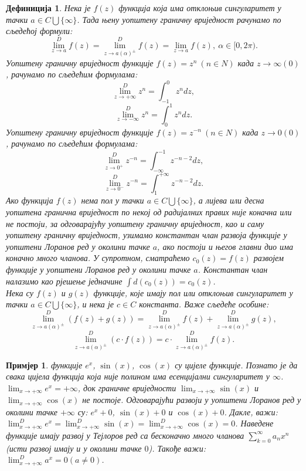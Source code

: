 \documentclass[12pt]{article}
\newtheorem{definition}{Дефиниција}
\newtheorem{example}{Примјер}
\begin{document}
\begin{definition}
Нека је $f(z)$ функција која има отклоњив сингуларитет у тачки $a\in C\bigcup\{\infty\}$. 
Тада њену уопштену граничну вриједност рачунамо по сљедећој формули: $$\lim^D_{z\to a} f(z)=\lim^D_{z\to a(\alpha)^\pm} f(z)=\lim_{z\to a} f(z),\ \alpha\in[0,2\pi).$$ Уопштену граничну вриједност функције $f(z)=z^n\ (n\in N)$ када $z\to\infty(0)$, рачунамо по сљедећим формулама: $$\lim^D_{z\to+\infty} z^n=\int_{-1}^0 z^n dz,$$ $$\lim^D_{z\to-\infty} z^n=\int_0^1 z^n dz.$$ Уопштену граничну вриједност функције $f(z)=z^{-n}\ (n\in N)$ када $z\to 0(0)$, рачунамо по сљедећим формулама:  $$\lim^D_{z\to 0^+} z^{-n}=\int_{-\infty}^{-1} z^{-n-2} dz,$$ $$\lim^D_{z\to 0^-} z^{-n}=\int_1^{+\infty} z^{-n-2} dz.$$ Ако функција $f(z)$ нема пол у тачки $a\in C\bigcup\{\infty\}$, а лијева или десна уопштена гранична вриједност по некој од радијалних правих није коначна или не постоји, за одговарајућу уопштену граничну вриједност, као и саму уопштену граничну вриједност, узимамо константан члан развоја функције у уопштени Лоранов ред у околини тачке $a$, ако постоји и његов главни дио има коначно много чланова. У супротном, сматраћемо $c_0(z)=f(z)$ развојем функције у уопштени Лоранов ред у околини тачке $a$. Константан члан налазимо као рјешење једначине $\int d(c_0(z))=c_0(z)$. \\ 
Нека су $f(z)$ и $g(z)$ функције, које имају пол или отклоњив сингуларитет у тачки $a\in C\bigcup\{\infty\}$, и нека је $c\in C$ константа. Важе сљедеће особине: $$\lim^D_{z\to a(\alpha)^\pm}(f(z)+g(z))=\lim^D_{z\to a(\alpha)^\pm}f(z)+\lim^D_{z\to a(\alpha)^\pm}g(z),$$
$$\lim^D_{z\to a(\alpha)^\pm}(c\cdot f(z))=c\cdot\lim^D_{z\to a(\alpha)^\pm}f(z).$$
\end{definition}

\begin{example}
функције $e^x$, $\sin(x)$, $\cos(x)$ су цијеле функције. Познато је да свака цијела функција која није полином има есенцијални сингуларитет у $\infty$. \\
$\lim_{x\to+\infty}e^x=+\infty$, док граничне вриједности $\lim_{x\to+\infty}\sin(x)$ и $\lim_{x\to+\infty}\cos(x)$ не постоје. Одговарајући развоји у уопштени Лоранов ред у околини тачке $+\infty$ су: $e^x+0$, $\sin(x)+0$ и $\cos(x)+0$. Дакле, важи: $\lim^D_{x\to+\infty}e^x=\lim^D_{x\to+\infty}\sin(x)=\lim^D_{x\to+\infty}\cos(x)=0$. Наведене функције имају развој у Тејлоров ред са бесконачно много чланова $\sum_{k=0}^\infty a_nx^n$ (исти развој имају и у околини тачке $0$). Такође важи: $\lim^D_{x\to+\infty}a^x=0 (a\not=0)$.
\end{example}
\end{document}
